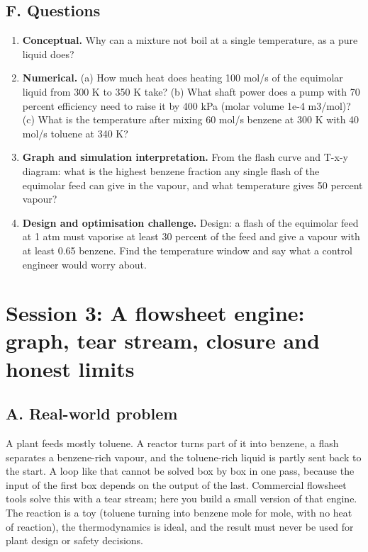 \documentclass[11pt,a4paper]{article}
\begin{document}
\subsection*{F. Questions}
\begin{enumerate}[nosep]
\item \textbf{Conceptual.} Why can a mixture not boil at a single temperature, as a pure liquid does?
\item \textbf{Numerical.} (a) How much heat does heating 100 mol/s of the equimolar liquid from 300 K to 350 K take? (b) What shaft power does a pump with 70 percent efficiency need to raise it by 400 kPa (molar volume 1e-4 m3/mol)? (c) What is the temperature after mixing 60 mol/s benzene at 300 K with 40 mol/s toluene at 340 K?
\item \textbf{Graph and simulation interpretation.} From the flash curve and T-x-y diagram: what is the highest benzene fraction any single flash of the equimolar feed can give in the vapour, and what temperature gives 50 percent vapour?
\item \textbf{Design and optimisation challenge.} Design: a flash of the equimolar feed at 1 atm must vaporise at least 30 percent of the feed and give a vapour with at least 0.65 benzene. Find the temperature window and say what a control engineer would worry about.
\end{enumerate}

\section{Session 3: A flowsheet engine: graph, tear stream, closure and honest limits}

\subsection*{A. Real-world problem}
A plant feeds mostly toluene. A reactor turns part of it into benzene, a flash separates a benzene-rich vapour, and the toluene-rich liquid is partly sent back to the start. A loop like that cannot be solved box by box in one pass, because the input of the first box depends on the output of the last. Commercial flowsheet tools solve this with a tear stream; here you build a small version of that engine. The reaction is a toy (toluene turning into benzene mole for mole, with no heat of reaction), the thermodynamics is ideal, and the result must never be used for plant design or safety decisions.
\end{document}
